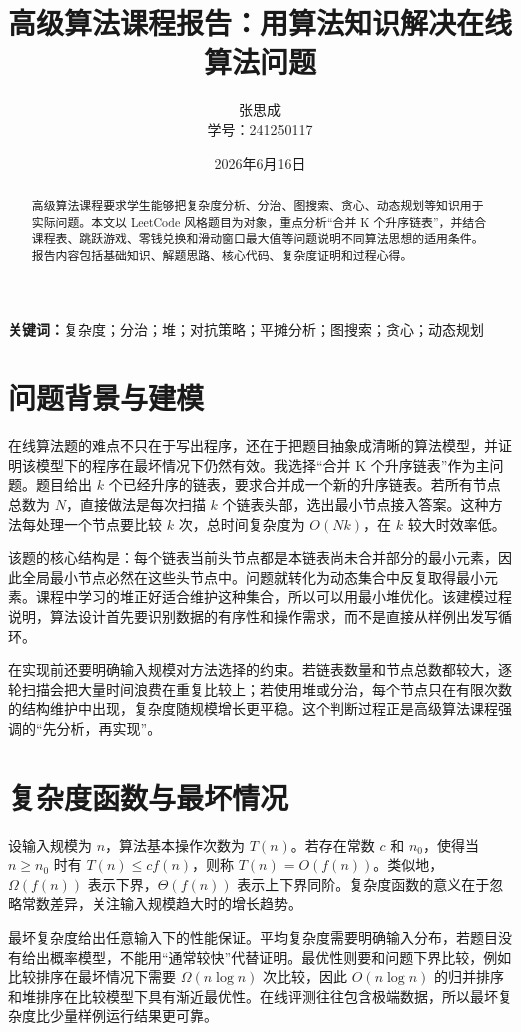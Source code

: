 \documentclass[UTF8,a4paper,12pt]{ctexart}
\title{\heiti 高级算法课程报告：用算法知识解决在线算法问题}
\author{张思成\\学号：241250117}
\date{2026年6月16日}
\begin{document}
\maketitle

\begin{abstract}
高级算法课程要求学生能够把复杂度分析、分治、图搜索、贪心、动态规划等知识用于实际问题。本文以 LeetCode 风格题目为对象，重点分析“合并 K 个升序链表”，并结合课程表、跳跃游戏、零钱兑换和滑动窗口最大值等问题说明不同算法思想的适用条件。报告内容包括基础知识、解题思路、核心代码、复杂度证明和过程心得。
\end{abstract}

\textbf{关键词：}复杂度；分治；堆；对抗策略；平摊分析；图搜索；贪心；动态规划

\section{问题背景与建模}

在线算法题的难点不只在于写出程序，还在于把题目抽象成清晰的算法模型，并证明该模型下的程序在最坏情况下仍然有效。我选择“合并 K 个升序链表”作为主问题。题目给出 $k$ 个已经升序的链表，要求合并成一个新的升序链表。若所有节点总数为 $N$，直接做法是每次扫描 $k$ 个链表头部，选出最小节点接入答案。这种方法每处理一个节点要比较 $k$ 次，总时间复杂度为 $O(Nk)$，在 $k$ 较大时效率低。

该题的核心结构是：每个链表当前头节点都是本链表尚未合并部分的最小元素，因此全局最小节点必然在这些头节点中。问题就转化为动态集合中反复取得最小元素。课程中学习的堆正好适合维护这种集合，所以可以用最小堆优化。该建模过程说明，算法设计首先要识别数据的有序性和操作需求，而不是直接从样例出发写循环。

在实现前还要明确输入规模对方法选择的约束。若链表数量和节点总数都较大，逐轮扫描会把大量时间浪费在重复比较上；若使用堆或分治，每个节点只在有限次数的结构维护中出现，复杂度随规模增长更平稳。这个判断过程正是高级算法课程强调的“先分析，再实现”。

\section{复杂度函数与最坏情况}

设输入规模为 $n$，算法基本操作次数为 $T(n)$。若存在常数 $c$ 和 $n_0$，使得当 $n\ge n_0$ 时有 $T(n)\le c f(n)$，则称 $T(n)=O(f(n))$。类似地，$\Omega(f(n))$ 表示下界，$\Theta(f(n))$ 表示上下界同阶。复杂度函数的意义在于忽略常数差异，关注输入规模趋大时的增长趋势。

最坏复杂度给出任意输入下的性能保证。平均复杂度需要明确输入分布，若题目没有给出概率模型，不能用“通常较快”代替证明。最优性则要和问题下界比较，例如比较排序在最坏情况下需要 $\Omega(n\log n)$ 次比较，因此 $O(n\log n)$ 的归并排序和堆排序在比较模型下具有渐近最优性。在线评测往往包含极端数据，所以最坏复杂度比少量样例运行结果更可靠。
\end{document}
